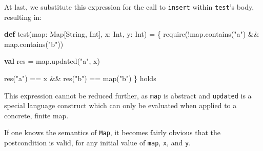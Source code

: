 \documentclass[ignorenonframetext,]{beamer}
\newenvironment{Shaded}{}{}
\newcommand{\FunctionTok}[1]{\textcolor[rgb]{0.02,0.16,0.49}{#1}}
\newcommand{\KeywordTok}[1]{\textcolor[rgb]{0.00,0.44,0.13}{\textbf{#1}}}
\newcommand{\NormalTok}[1]{#1}
\newcommand{\StringTok}[1]{\textcolor[rgb]{0.25,0.44,0.63}{#1}}
\begin{document}
\begin{frame}[fragile]

At last, we substitute this expression for the call to \texttt{insert}
within \texttt{test}’s body, resulting in:

\begin{Shaded}
\begin{Highlighting}[]
\KeywordTok{def} \FunctionTok{test}\NormalTok{(map: Map[String, Int], x: Int, y: Int) = \{}
  \FunctionTok{require}\NormalTok{(!map.}\FunctionTok{contains}\NormalTok{(}\StringTok{"a"}\NormalTok{) && map.}\FunctionTok{contains}\NormalTok{(}\StringTok{"b"}\NormalTok{))}

  \KeywordTok{val}\NormalTok{ res = map.}\FunctionTok{updated}\NormalTok{(}\StringTok{"a"}\NormalTok{, x)}

  \FunctionTok{res}\NormalTok{(}\StringTok{"a"}\NormalTok{) == x && }\FunctionTok{res}\NormalTok{(}\StringTok{"b"}\NormalTok{) == }\FunctionTok{map}\NormalTok{(}\StringTok{"b"}\NormalTok{)}
\NormalTok{\} holds}
\end{Highlighting}
\end{Shaded}

\end{frame}

\begin{frame}[fragile]

This expression cannot be reduced further, as \texttt{map} is abstract
and \texttt{updated} is a special language construct which can only be
evaluated when applied to a concrete, finite map.

If one knows the semantics of \texttt{Map}, it becomes fairly obvious
that the postcondition is valid, for any initial value of \texttt{map},
\texttt{x}, and \texttt{y}.

\end{frame}
\end{document}
